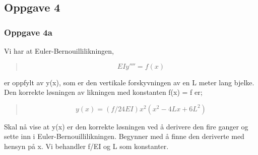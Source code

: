 \subsection{Oppgave 4}
\subsubsection{Oppgave 4a}
Vi har at Euler-Bernouillilikningen,
\begin{quote}
\begin{equation}
EIy'''' = f(x)
\end{equation}
\end{quote}
er oppfylt av y(x), som er den vertikale forskyvningen av en L meter lang bjelke. Den korrekte løsningen av likningen med konstanten f(x) = f er;
\begin{quote}
\begin{equation}
y(x)=(f/24EI) x^2 (x^2-4Lx+6L^2)
\end{equation}
\end{quote}
Skal nå vise at y(x) er den korrekte løsningen ved å derivere den fire ganger og sette inn i Euler-Bernouillilikningen. Begynner med å finne den deriverte med hensyn på x. Vi behandler f/EI og L som konstanter.


